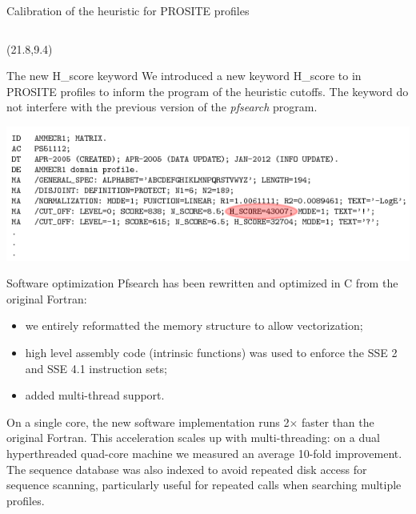 \documentclass[final]{beamer}
\newcommand{\green}[1]{\textcolor{green!60!black}{#1}}
\newcommand{\red}[1]{\textcolor{red!60!black}{#1}}
\newcommand{\blue}[1]{\textcolor{blue!60!black}{#1}}
\begin{document}
\begin{frame}{}
\begin{textblock}{19.5}
\begin{block}{Calibration of the heuristic for PROSITE profiles}
\begin{columns}[c]
\end{columns}
\end{block}
\end{textblock}

\begin{textblock}{19.3}(21.8,9.4)
\begin{block}{The new H\_score keyword}
We introduced a new keyword H\_score to in PROSITE profiles to inform the program of the heuristic cutoffs. The keyword do not interfere with the previous version of the \emph{pfsearch} program.
    \centerline{\includegraphics[angle=0,width=1.00\hsize]{prf_synt.pdf}}
\end{block}

\begin{block}{Software optimization}
Pfsearch has been rewritten and optimized in C from the original Fortran:
\begin{itemize}
\item we entirely reformatted the memory structure to allow vectorization;
\item high level assembly code (intrinsic functions) was used to enforce the SSE 2 and SSE 4.1 instruction sets;
\item added multi-thread support.
\end{itemize}
On a single core, the new software implementation runs 2$\times$ faster than the original Fortran. This acceleration scales up with multi-threading: on a dual hyperthreaded quad-core machine we measured an average 10-fold improvement. The sequence database was also indexed to avoid repeated disk access for sequence scanning, particularly useful for repeated calls when searching multiple profiles. 
\end{block}


\end{textblock}
\end{frame}
\end{document}
